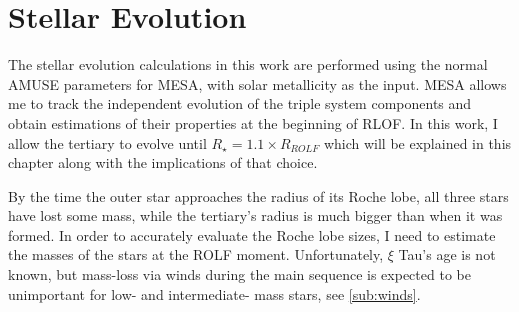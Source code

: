\section{Stellar Evolution}\label{sec:stellar_evolution}

The stellar evolution calculations in this work are performed using the normal AMUSE parameters for MESA, with solar metallicity as the input.
MESA allows me to track the independent evolution of the triple system components and obtain estimations of their properties at the beginning of RLOF. In this work, I allow the tertiary to evolve until $R_{\star} = 1.1 \times R_{ROLF}$ which will be explained in this chapter along with the implications of that choice.

By the time the outer star approaches the radius of its Roche lobe, all three stars have lost some mass, while the tertiary's radius is much bigger than when it was formed. In order to accurately evaluate the Roche lobe sizes,  I need to estimate the masses of the stars at the ROLF moment. Unfortunately, $\xi$ Tau's age is not known, but mass-loss via winds during the main sequence is expected to be unimportant for low- and intermediate- mass stars, see \cref{sub:winds}.

